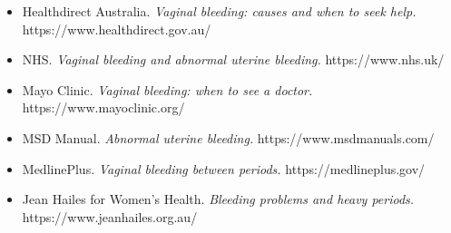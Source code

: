 \begin{itemize}
    \item Healthdirect Australia. \textit{Vaginal bleeding: causes and when to seek help.} https://www.healthdirect.gov.au/
    \item NHS. \textit{Vaginal bleeding and abnormal uterine bleeding.} https://www.nhs.uk/
    \item Mayo Clinic. \textit{Vaginal bleeding: when to see a doctor.} https://www.mayoclinic.org/
    \item MSD Manual. \textit{Abnormal uterine bleeding.} https://www.msdmanuals.com/
    \item MedlinePlus. \textit{Vaginal bleeding between periods.} https://medlineplus.gov/
    \item Jean Hailes for Women's Health. \textit{Bleeding problems and heavy periods.} https://www.jeanhailes.org.au/
\end{itemize}

